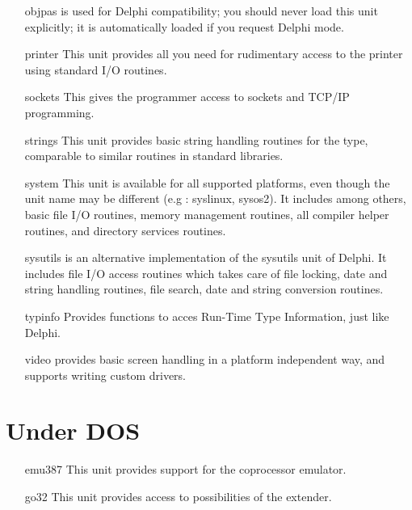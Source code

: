 \begin{itemize}
\item [objpas] is used for Delphi compatibility; you should never load this
unit explicitly; it is automatically loaded if you request Delphi mode.
\item [printer]  This unit provides all you need for rudimentary access
to the printer using standard I/O routines.
\item[sockets] This gives the programmer access to sockets and TCP/IP 
programming.
\item [strings] This unit provides basic string handling routines for the
 type, comparable to similar routines in standard 
libraries.
\item [system] This unit is available for all supported platforms, even
though the unit name may be different (e.g : syslinux, sysos2). It includes
among others, basic file I/O routines, memory management routines, all compiler 
helper routines, and directory services routines. 
\item[sysutils] is an alternative implementation of the sysutils unit of
Delphi. It includes file I/O access routines which takes care of file
locking, date and string handling routines, file search, date and string 
conversion routines.
\item[typinfo] Provides functions to acces Run-Time Type Information, just
like Delphi.
\item [video] provides basic screen handling in a platform independent way,
and supports writing custom drivers.
\end{itemize}

%
%
\section{Under DOS}
\begin{itemize}
\item [emu387] This unit provides support for the coprocessor emulator.
\item [go32] This unit provides access to possibilities of the 
\dos extender.
\end{itemize}

%
%
